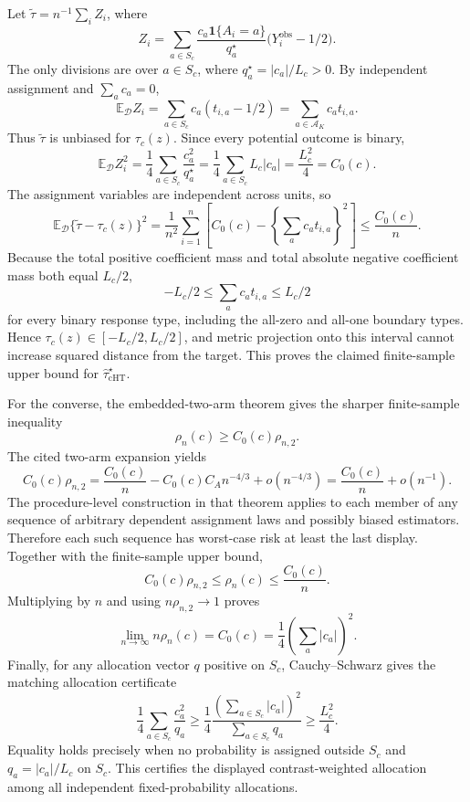 Let \(\widetilde\tau=n^{-1}\sum_iZ_i\), where
\[
 Z_i=\sum_{a\in S_c}\frac{c_a\mathbf 1\{A_i=a\}}{q_a^\star}
 \bigl(Y_i^{\mathrm{obs}}-1/2\bigr).
\]
The only divisions are over \(a\in S_c\), where \(q_a^\star=|c_a|/L_c>0\).  By independent assignment and \(\sum_ac_a=0\),
\[
 \mathbb E_{\mathcal D}Z_i
 =\sum_{a\in S_c}c_a(t_{i,a}-1/2)
 =\sum_{a\in\mathcal A_K}c_at_{i,a}.
\]
Thus \(\widetilde\tau\) is unbiased for \(\tau_c(z)\).  Since every potential outcome is binary,
\[
 \mathbb E_{\mathcal D}Z_i^2
 =\frac14\sum_{a\in S_c}\frac{c_a^2}{q_a^\star}
 =\frac14\sum_{a\in S_c}L_c|c_a|
 =\frac{L_c^2}{4}=C_0(c).
\]
The assignment variables are independent across units, so
\[
 \mathbb E_{\mathcal D}\{\widetilde\tau-\tau_c(z)\}^2
 =\frac1{n^2}\sum_{i=1}^n
 \left[C_0(c)-\left\{\sum_ac_at_{i,a}\right\}^2\right]
 \leq\frac{C_0(c)}n.
\]
Because the total positive coefficient mass and total absolute negative coefficient mass both equal \(L_c/2\),
\[
 -L_c/2\leq\sum_ac_at_{i,a}\leq L_c/2
\]
for every binary response type, including the all-zero and all-one boundary types.  Hence \(\tau_c(z)\in[-L_c/2,L_c/2]\), and metric projection onto this interval cannot increase squared distance from the target.  This proves the claimed finite-sample upper bound for \(\widehat\tau_{\mathrm{cHT}}^\star\).

For the converse, the embedded-two-arm theorem gives the sharper finite-sample inequality
\[
 \rho_n(c)\geq C_0(c)\rho_{n,2}.
\]
The cited two-arm expansion yields
\[
 C_0(c)\rho_{n,2}
 =\frac{C_0(c)}n-C_0(c)C_A n^{-4/3}+o(n^{-4/3})
 =\frac{C_0(c)}n+o(n^{-1}).
\]
The procedure-level construction in that theorem applies to each member of any sequence of arbitrary dependent assignment laws and possibly biased estimators.  Therefore each such sequence has worst-case risk at least the last display.  Together with the finite-sample upper bound,
\[
 C_0(c)\rho_{n,2}\leq\rho_n(c)\leq\frac{C_0(c)}n.
\]
Multiplying by \(n\) and using \(n\rho_{n,2}\to1\) proves
\[
 \lim_{n\to\infty}n\rho_n(c)=C_0(c)=\frac14\left(\sum_a|c_a|\right)^2.
\]
Finally, for any allocation vector \(q\) positive on \(S_c\), Cauchy--Schwarz gives the matching allocation certificate
\[
 \frac14\sum_{a\in S_c}\frac{c_a^2}{q_a}
 \geq\frac14\frac{\left(\sum_{a\in S_c}|c_a|\right)^2}{\sum_{a\in S_c}q_a}
 \geq\frac{L_c^2}{4}.
\]
Equality holds precisely when no probability is assigned outside \(S_c\) and \(q_a=|c_a|/L_c\) on \(S_c\).  This certifies the displayed contrast-weighted allocation among all independent fixed-probability allocations.